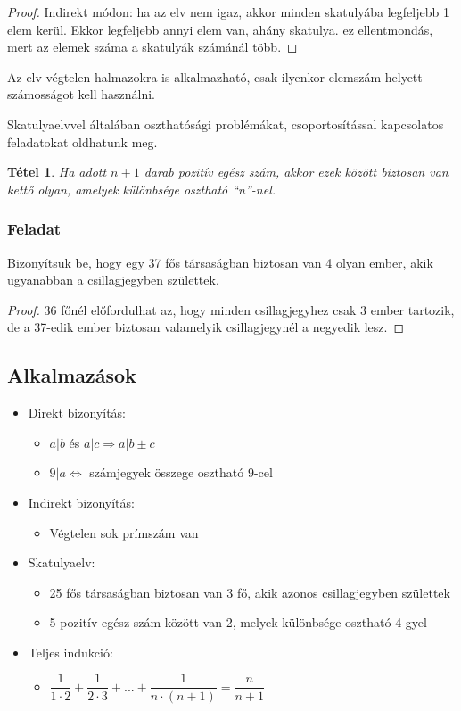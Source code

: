 \documentclass[12pt,a4paper]{article}
\newtheorem{theorem}{Tétel} [section]
\begin{document}
\begin{proof}
Indirekt módon: ha az elv nem igaz, akkor minden skatulyába legfeljebb 1 elem kerül. Ekkor legfeljebb annyi elem van, ahány skatulya. ez ellentmondás, mert az elemek száma a skatulyák számánál több.
\end{proof}

Az elv végtelen halmazokra is alkalmazható, csak ilyenkor elemszám helyett számosságot kell használni.

Skatulyaelvvel általában oszthatósági problémákat, csoportosítással kapcsolatos feladatokat oldhatunk meg.

\begin{theorem}
Ha adott $n + 1$ darab pozitív egész szám, akkor ezek között biztosan van kettő olyan, amelyek különbsége osztható ``n''-nel.
\end{theorem}

\subsubsection*{Feladat}

Bizonyítsuk be, hogy egy 37 fős társaságban biztosan van 4 olyan ember, akik ugyanabban a csillagjegyben születtek.

\begin{proof}
36 főnél előfordulhat az, hogy minden csillagjegyhez csak 3 ember tartozik, de a 37-edik ember biztosan valamelyik csillagjegynél a negyedik lesz.
\end{proof}

\subsection{Alkalmazások}
\begin{itemize}
\item Direkt bizonyítás:
\begin{itemize}
\item $a|b$ és $a|c \Rightarrow a|b\pm c$
\item $9|a\Leftrightarrow$ számjegyek összege osztható 9-cel
\end{itemize}
\item Indirekt bizonyítás:
\begin{itemize}
\item Végtelen sok prímszám van
\end{itemize}
\item Skatulyaelv:
\begin{itemize}
\item 25 fős társaságban biztosan van 3 fő, akik azonos csillagjegyben születtek
\item 5 pozitív egész szám között van 2, melyek különbsége osztható 4-gyel
\end{itemize}
\item Teljes indukció:
\begin{itemize}
\item $\dfrac{1}{1\cdot 2}+\dfrac{1}{2\cdot 3}+...+\dfrac{1}{n\cdot (n+1)}=\dfrac{n}{n+1}$
\end{itemize}
\end{itemize}
\end{document}
